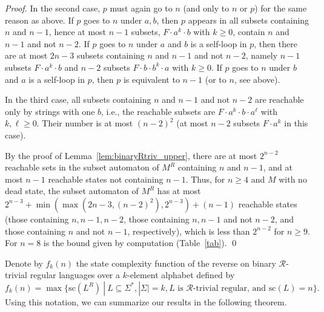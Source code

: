 \documentclass[runningheads]{llncs}
\newcommand{\R}{$\mathcal{R}$}
\newcommand{\makeset}[2]{\ensuremath{ \{ #1 \: | \: #2 \} }}
\renewcommand{\sc}{\mathrm{sc}}
\begin{document}
\begin{proof}
    In the second case,
    $p$ must again go to $n$ (and only to $n$ or $p$) for the same reason as above.
    If $p$ goes to $n$ under $a,b$,
    then $p$ appears in all subsets containing $n$ and $n-1$, 
    hence at most $n-1$ subsets, $F\cdot a^k \cdot b$ with $k\ge 0$, contain $n$ and $n-1$ and not $n-2$.
    If $p$ goes to $n$ under $a$ and $b$ is a self-loop in $p$,
    then there are at most $2n-3$ subsets containing $n$ and $n-1$ and not $n-2$,
    namely $n-1$ subsets $F\cdot a^k\cdot b$ and $n-2$ subsets $F\cdot b \cdot b^k\cdot a$ with $k\ge 0$.
    If $p$ goes to $n$ under $b$ and $a$ is a self-loop in $p$,
    then $p$ is equivalent to $n-1$ (or to $n$, see above).


    In the third case, all subsets containing $n$ and $n-1$ and not $n-2$ are reachable only by strings with one $b$, i.e., the reachable subsets are $F \cdot a^k \cdot b \cdot a^\ell$ with $k,\ell \ge 0$. Their number is at most $(n-2)^2$ (at most $n-2$ subsets $F\cdot a^k$ in this case).


    By the proof of Lemma~\ref{lem:binaryRtriv_upper}, there are at most $2^{n-2}$ reachable sets in the subset automaton of $M^R$ containing $n$ and $n-1$, and at most $n-1$ reachable states not containing $n-1$. Thus, for $n\ge 4$ and $M$ with no dead state, the subset automaton of $M^R$ has at most $2^{n-3} + \min(\max(2n-3,(n-2)^2),2^{n-3}) + (n-1)$ reachable states (those containing $n,n-1,n-2$, those containing $n,n-1$ and not $n-2$, and those containing $n$ and not $n-1$, respectively),
    which is less than $2^{n-2}$ for $n\ge 9$.
    For $n=8$ is the bound given by computation (Table~\ref{tab}).
  \qed
  \end{proof}

  Denote by $f_k(n)$ the state complexity function of the reverse
  on binary \R-trivial regular languages over a $k$-element alphabet defined by
  \begin{equation*}\label{sc}
    f_k(n) = \max \makeset{\sc(L^R)}{L\subseteq\Sigma^*, |\Sigma|=k,
             L \text{ is \R-trivial regular, and }
             \sc(L)=n}.
  \end{equation*}
  Using this notation, 
  we can summarize our results
  in the following theorem.
\end{document}
